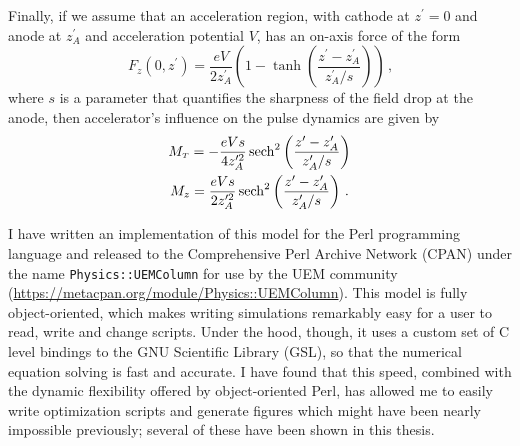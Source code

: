Finally, if we assume that an acceleration region, with cathode at $z^{\prime} = 0$ and anode at $z^{\prime}_A$ and acceleration potential $V$, has an on-axis force of the form
\begin{equation} \label{eq:anode_tanh}
  F_z(0,z^{\prime}) = \frac{eV}{2z^{\prime}_A} \left( 1 - \tanh \left( \frac{ z^{\prime} - z^{\prime}_A }{ z^{\prime}_A / s } \right) \right) \,\text{,}
\end{equation}
where $s$ is a parameter that quantifies the sharpness of the field drop at the anode, then accelerator's influence on the pulse dynamics are given by
\begin{gather}
  M_{{\scriptscriptstyle T}} = -\frac{eVs}{4z^{\prime 2}_A} \operatorname{sech}^2 \left( \frac{z^{\prime} - z^{\prime}_A }{ z^{\prime}_A / s } \right) \\
  M_z = \frac{eVs}{2z^{\prime 2}_A} \operatorname{sech}^2 \left( \frac{z^{\prime} - z^{\prime}_A }{ z^{\prime}_A / s } \right) \, \text{.}
\end{gather}

I have written an implementation of this model for the Perl programming language and released to the Comprehensive Perl Archive Network (CPAN) under the name \verb!Physics::UEMColumn! for use by the UEM community (\url{https://metacpan.org/module/Physics::UEMColumn}).
This model is fully object-oriented, which makes writing simulations remarkably easy for a user to read, write and change scripts.
Under the hood, though, it uses a custom set of C level bindings to the GNU Scientific Library (GSL), so that the numerical equation solving is fast and accurate.
I have found that this speed, combined with the dynamic flexibility offered by object-oriented Perl, has allowed me to easily write optimization scripts and generate figures which might have been nearly impossible previously; several of these have been shown in this thesis.
